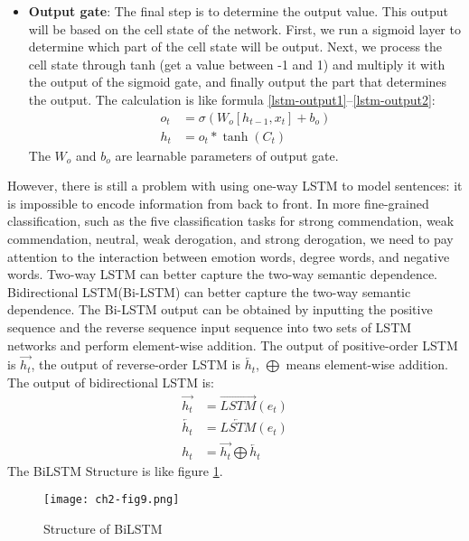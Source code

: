 \begin{itemize}
	\item \textbf{Output gate}: The final step is to determine the output value. This output will be based on the cell state of the network. First, we run a sigmoid layer to determine which part of the cell state will be output. Next, we process the cell state through tanh (get a value between -1 and 1) and multiply it with the output of the sigmoid gate, and finally output the part that determines the output. The calculation is like formula \ref{lstm-output1}--\ref{lstm-output2}:
	      \begin{align}
		      o_{t} & =\sigma(W_{o}[h_{t-1}, x_{t}]+b_{o}) \label{lstm-output1} \\
		      h_{t} & =o_{t} * \tanh (C_{t}) \label{lstm-output2}
	      \end{align}
	      The \(W_o\) and \(b_o\) are learnable parameters of output gate.
\end{itemize}

However, there is still a problem with using one-way LSTM to model sentences: it is impossible to encode information from back to front. In more fine-grained classification, such as the five classification tasks for strong commendation, weak commendation, neutral, weak derogation, and strong derogation, we need to pay attention to the interaction between emotion words, degree words, and negative words. Two-way LSTM can better capture the two-way semantic dependence. Bidirectional LSTM(Bi-LSTM) can better capture the two-way semantic dependence. The Bi-LSTM output can be obtained by inputting the positive sequence and the reverse sequence input sequence into two sets of LSTM networks and perform element-wise addition. The output of positive-order LSTM is \(\overrightarrow{h_t}\), the output of reverse-order LSTM is \(\overleftarrow{h_t}\), \(\bigoplus \) means element-wise addition. The output of bidirectional LSTM is:
\begin{align}
	\overrightarrow{h_t} & = \overrightarrow{LSTM}(e_t)                       \\
	\overleftarrow{h_t}  & = \overleftarrow{LSTM}(e_t)                        \\
	h_t                  & =\overrightarrow{h_t}\bigoplus \overleftarrow{h_t}
\end{align}
The BiLSTM Structure is like figure \ref{ch2-fig9}.

\begin{figure}[h]
	\centering
	\texttt{[image: ch2-fig9.png]}
	\caption{Structure of BiLSTM}
	\label{ch2-fig9}
\end{figure}

